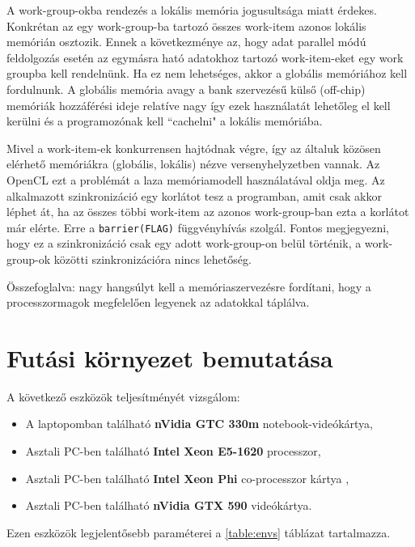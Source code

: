 	A work-group-okba rendezés a lokális memória jogusultsága miatt érdekes.
	Konkrétan az egy work-group-ba tartozó összes work-item azonos lokális memórián
	osztozik.
	Ennek a következménye az, hogy adat parallel módú feldolgozás esetén
	az egymásra ható adatokhoz tartozó work-item-eket egy work groupba kell
	rendelnünk.
	Ha ez nem lehetséges, akkor a globális memóriához kell fordulnunk.
	A globális memória avagy a bank szervezésű külső (off-chip) memóriák
	hozzáférési ideje relatíve nagy így ezek használatát lehetőleg el kell kerülni
	és a programozónak kell ``cachelni" a lokális memóriába.
	
	Mivel a work-item-ek konkurrensen hajtódnak végre, így az általuk közösen elérhető memóriákra
	(globális, lokális) nézve versenyhelyzetben vannak.
	Az OpenCL ezt a problémát a laza memóriamodell használatával oldja meg. Az alkalmazott
	szinkronizáció egy korlátot tesz a programban, amit csak akkor léphet át, ha az összes többi
	work-item az azonos work-group-ban ezta a korlátot már elérte. Erre a \texttt{barrier(FLAG)}
	függvényhívás szolgál. Fontos megjegyezni, hogy ez a szinkronizáció csak egy adott
	work-group-on belül történik, a work-group-ok közötti szinkronizációra nincs lehetőség. 
	
	\begin{center}
	Összefoglalva: nagy hangsúlyt kell a memóriaszervezésre fordítani, hogy a
	processzormagok megfelelően legyenek az adatokkal táplálva.
	\end{center}


\section{Futási környezet bemutatása}
	A következő eszközök teljesítményét vizsgálom:
	\begin{itemize}
		\item A laptopomban található \textbf{nVidia GTC 330m} notebook-videókártya,
		\item Asztali PC-ben található \textbf{Intel Xeon E5-1620} processzor,
 		\item Asztali PC-ben található \textbf{Intel Xeon Phi} co-processzor kártya \cite{phi,mic},
 		\item Asztali PC-ben található  \textbf{nVidia GTX 590} videókártya.
	\end{itemize}
	Ezen eszközök legjelentősebb paraméterei a \ref{table:envs} táblázat tartalmazza.
	
